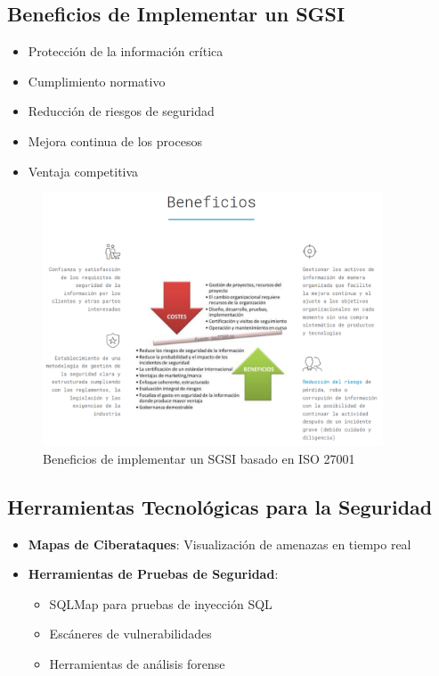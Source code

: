 \documentclass[12pt,a4paper]{article}
\begin{document}
\subsection{Beneficios de Implementar un SGSI}
\begin{itemize}
    \item Protección de la información crítica
    \item Cumplimiento normativo
    \item Reducción de riesgos de seguridad
    \item Mejora continua de los procesos
    \item Ventaja competitiva
\end{itemize}

\begin{figure}[H]
    \centering
    \includegraphics[width=0.9\textwidth]{sgsi_beneficio.png}
    \caption{Beneficios de implementar un SGSI basado en ISO 27001}
    \label{fig:sgsi_beneficio}
\end{figure}

\subsection{Herramientas Tecnológicas para la Seguridad}
\begin{itemize}
    \item \textbf{Mapas de Ciberataques}: Visualización de amenazas en tiempo real
    \item \textbf{Herramientas de Pruebas de Seguridad}:
    \begin{itemize}
        \item SQLMap para pruebas de inyección SQL
        \item Escáneres de vulnerabilidades
        \item Herramientas de análisis forense
    \end{itemize}
\end{itemize}
\end{document}

